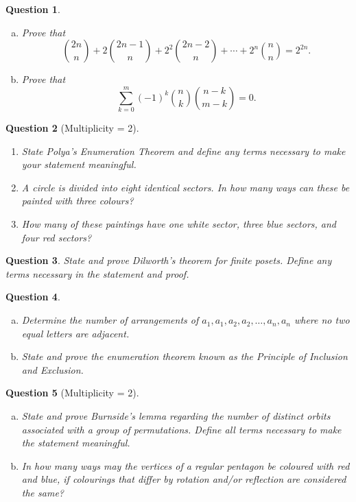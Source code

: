 \documentclass[12]{article}
\newtheorem{question}{Question}
\theoremstyle{definition}
\begin{document}
	\begin{question}
		\
		\begin{enumerate}[a)]
			\item Prove that
			$$ {2n \choose n} + 2{2n-1 \choose n} + 2^2{2n - 2 \choose n} + \cdots + 2^n{n \choose n} = 2^{2n}.$$
			\item Prove that
			$$ \sum_{k=0}^m (-1)^k{n \choose k} {n-k \choose m-k} = 0.$$
		\end{enumerate}
	\end{question}

	\begin{question}[Multiplicity = 2]
		\
		\begin{enumerate}
			\item State Polya's Enumeration Theorem and define any terms necessary to make your statement meaningful.
			\item A circle is divided into eight identical sectors.  In how many ways can these be painted with three colours?
			\item How many of these paintings have one white sector, three blue sectors, and four red sectors?
		\end{enumerate}
	\end{question}

	\begin{question}
		State and prove Dilworth's theorem for finite posets.  Define any terms necessary in the statement and proof.
	\end{question}

	\newpage
	
	\begin{question}
		\
		\begin{enumerate}[a)]
			\item Determine the number of arrangements of $a_1, a_1, a_2, a_2, \ldots, a_n, a_n$ where no two equal letters are adjacent.
			\item State and prove the enumeration theorem known as the Principle of Inclusion and Exclusion.
		\end{enumerate}
	\end{question}

	\begin{question}[Multiplicity = 2]
		\
		\begin{enumerate}[a)]
			\item State and prove Burnside's lemma regarding the number of distinct orbits associated with a group of permutations.  Define all terms necessary to make the statement meaningful.
			\item In how many ways may the vertices of a regular pentagon be coloured with red and blue, if colourings that differ by rotation and/or reflection are considered the same?
		\end{enumerate}
	\end{question}
\end{document}
